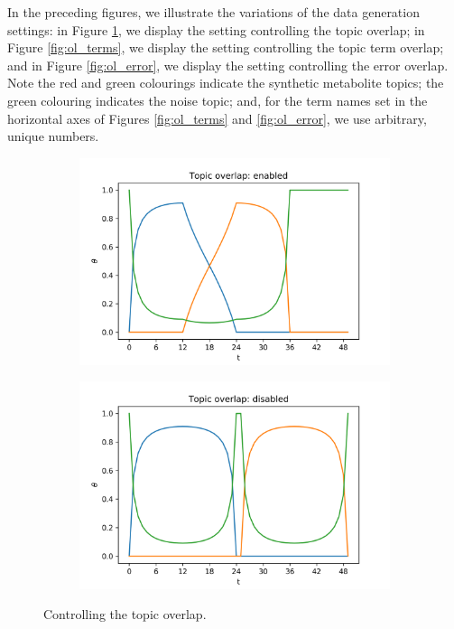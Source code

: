\documentclass{mpaper}
\begin{document}
\par In the preceding figures, we illustrate the variations of the data generation settings: in Figure \ref{fig:ol_topics}, we display the setting  controlling the topic overlap; in Figure \ref{fig:ol_terms}, we display the setting controlling the topic term overlap; and in Figure \ref{fig:ol_error}, we display the setting controlling the error overlap. Note the red and green colourings indicate the synthetic metabolite topics; the green colouring indicates the noise topic; and, for the term names set in the horizontal axes of Figures \ref{fig:ol_terms} and \ref{fig:ol_error}, we use arbitrary, unique numbers. 

\begin{figure}
  \centering
  \begin{subfigure}[b]{0.48\textwidth}
    \includegraphics[width=\linewidth]{theta_topic-ol.png}
  \end{subfigure}%

  \begin{subfigure}[b]{0.48\textwidth}
    \includegraphics[width=\linewidth]{theta_topic-nonol.png}
  \end{subfigure}%
  \caption{Controlling the topic overlap.}
  \label{fig:ol_topics}


\end{figure}
\end{document}

